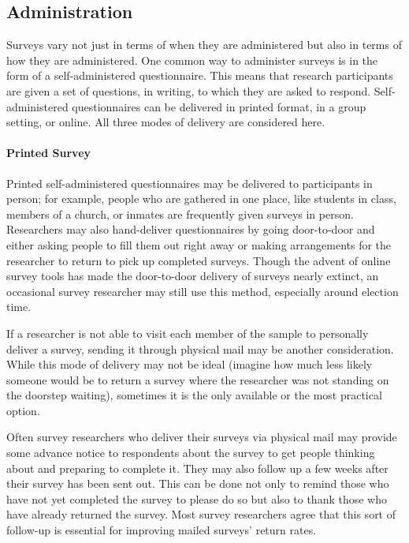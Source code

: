 \subsection{Administration}

Surveys vary not just in terms of when they are administered but also in terms of how they are administered. One common way to administer surveys is in the form of a self-administered \gls{questionnaire}. This means that research participants are given a set of questions, in writing, to which they are asked to respond. Self-administered questionnaires can be delivered in printed format, in a group setting, or online. All three modes of delivery are considered here.

\paragraph{Printed Survey}

Printed self-administered questionnaires may be delivered to participants in person; for example, people who are gathered in one place, like students in class, members of a church, or inmates are frequently given surveys in person. Researchers may also hand-deliver questionnaires by going door-to-door and either asking people to fill them out right away or making arrangements for the researcher to return to pick up completed surveys. Though the advent of online survey tools has made the door-to-door delivery of surveys nearly extinct, an occasional survey researcher may still use this method, especially around election time.

If a researcher is not able to visit each member of the sample to personally deliver a survey, sending it through physical mail may be another consideration. While this mode of delivery may not be ideal (imagine how much less likely someone would be to return a survey where the researcher was not standing on the doorstep waiting), sometimes it is the only available or the most practical option.

Often survey researchers who deliver their surveys via physical mail may provide some advance notice to respondents about the survey to get people thinking about and preparing to complete it. They may also follow up a few weeks after their survey has been sent out. This can be done not only to remind those who have not yet completed the survey to please do so but also to thank those who have already returned the survey. Most survey researchers agree that this sort of follow-up is essential for improving mailed surveys' return rates\cite{babbie2010unobtrusive}.


